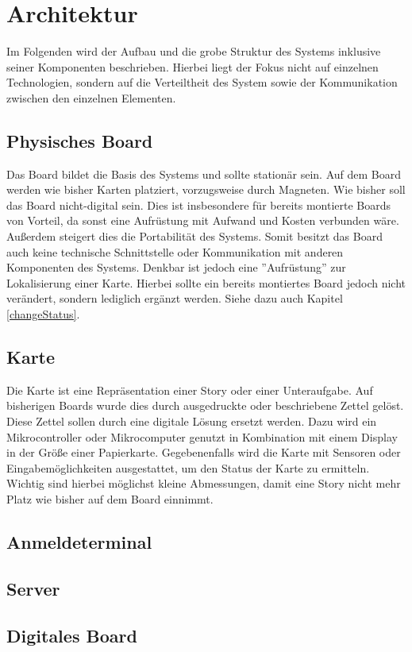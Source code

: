 \documentclass[12pt,titlepage]{scrartcl}
\begin{document}
	\section{Architektur}
	Im Folgenden wird der Aufbau und die grobe Struktur des Systems inklusive seiner Komponenten beschrieben. Hierbei liegt der Fokus nicht auf einzelnen Technologien, sondern auf die Verteiltheit des System sowie der Kommunikation zwischen den einzelnen Elementen.
		\subsection{Physisches Board}
		Das Board bildet die Basis des Systems und sollte stationär sein. Auf dem Board werden wie bisher Karten platziert, vorzugsweise durch Magneten. Wie bisher soll das Board nicht-digital sein. Dies ist insbesondere für bereits montierte Boards von Vorteil, da sonst eine Aufrüstung mit Aufwand und Kosten verbunden wäre. Außerdem steigert dies die Portabilität des Systems. Somit besitzt das Board auch keine technische Schnittstelle oder Kommunikation mit anderen Komponenten des Systems. Denkbar ist jedoch eine ''Aufrüstung'' zur Lokalisierung einer Karte. Hierbei sollte ein bereits montiertes Board jedoch nicht verändert, sondern lediglich ergänzt werden. Siehe dazu auch Kapitel \ref{changeStatus}.
		\subsection{Karte} \label{defKarte}
		Die Karte ist eine Repräsentation einer Story oder einer Unteraufgabe. Auf bisherigen Boards wurde dies durch ausgedruckte oder beschriebene Zettel gelöst. Diese Zettel sollen durch eine digitale Lösung ersetzt werden. Dazu wird ein Mikrocontroller oder Mikrocomputer genutzt in Kombination mit einem Display in der Größe einer Papierkarte. Gegebenenfalls wird die Karte mit Sensoren oder Eingabemöglichkeiten ausgestattet, um den Status der Karte zu ermitteln. Wichtig sind hierbei möglichst kleine Abmessungen, damit eine Story nicht mehr Platz wie bisher auf dem Board einnimmt. 
		\subsection{Anmeldeterminal}
		\subsection{Server}
		\subsection{Digitales Board}
\end{document}
